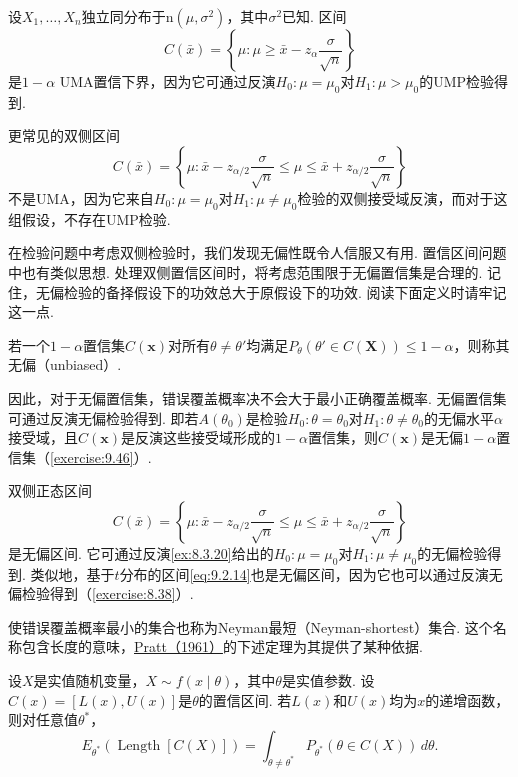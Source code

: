 \begin{example}[UMA置信界]\label{ex:9.3.6}
设$X_1,\ldots,X_n$独立同分布于$\mathrm n(\mu,\sigma^2)$，其中$\sigma^2$已知. 区间
$$C(\bar x)=\left\{\mu:\mu\ge\bar x-z_\alpha\frac\sigma{\sqrt n}\right\}$$
是$1-\alpha$ UMA置信下界，因为它可通过反演$H_0:\mu=\mu_0$对$H_1:\mu>\mu_0$的UMP检验得到.

更常见的双侧区间
$$C(\bar x)=\left\{\mu:\bar x-z_{\alpha/2}\frac\sigma{\sqrt n}\le\mu\le\bar x+z_{\alpha/2}\frac\sigma{\sqrt n}\right\}$$
不是UMA，因为它来自$H_0:\mu=\mu_0$对$H_1:\mu\ne\mu_0$检验的双侧接受域反演，而对于这组假设，不存在UMP检验.
\end{example}
在检验问题中考虑双侧检验时，我们发现无偏性既令人信服又有用. 置信区间问题中也有类似思想. 处理双侧置信区间时，将考虑范围限于无偏置信集是合理的. 记住，无偏检验的备择假设下的功效总大于原假设下的功效. 阅读下面定义时请牢记这一点.
\begin{definition}\label{def:9.3.7}
若一个$1-\alpha$置信集$C(\boldsymbol x)$对所有$\theta\ne\theta'$均满足$P_\theta(\theta'\in C(\boldsymbol X))\le1-\alpha$，则称其无偏（unbiased）.
\end{definition}
因此，对于无偏置信集，错误覆盖概率决不会大于最小正确覆盖概率. 无偏置信集可通过反演无偏检验得到. 即若$A(\theta_0)$是检验$H_0:\theta=\theta_0$对$H_1:\theta\ne\theta_0$的无偏水平$\alpha$接受域，且$C(\boldsymbol x)$是反演这些接受域形成的$1-\alpha$置信集，则$C(\boldsymbol x)$是无偏$1-\alpha$置信集（\autoref{exercise:9.46}）.
\begin{example}[续\autoref{ex:9.3.6}]\label{ex:9.3.8}
双侧正态区间
$$C(\bar x)=\left\{\mu:\bar x-z_{\alpha/2}\frac\sigma{\sqrt n}\le\mu\le\bar x+z_{\alpha/2}\frac\sigma{\sqrt n}\right\}$$
是无偏区间. 它可通过反演\autoref{ex:8.3.20}给出的$H_0:\mu=\mu_0$对$H_1:\mu\ne\mu_0$的无偏检验得到. 类似地，基于$t$分布的区间\eqref{eq:9.2.14}也是无偏区间，因为它也可以通过反演无偏检验得到（\autoref{exercise:8.38}）.
\end{example}
使错误覆盖概率最小的集合也称为Neyman最短（Neyman-shortest）集合. 这个名称包含长度的意味，\hyperref[bib:source246]{Pratt（1961）}的下述定理为其提供了某种依据.
\begin{theorem}[Pratt]\label{thm:9.3.9}
设$X$是实值随机变量，$X\sim f(x\mid\theta)$，其中$\theta$是实值参数. 设$C(x)=[L(x),U(x)]$是$\theta$的置信区间. 若$L(x)$和$U(x)$均为$x$的递增函数，则对任意值$\theta^*$，
\begin{equation}\label{eq:9.3.3}
E_{\theta^*}(\operatorname{Length}[C(X)])=\int_{\theta\ne\theta^*}P_{\theta^*}(\theta\in C(X))\,d\theta.
\end{equation}
\end{theorem}
